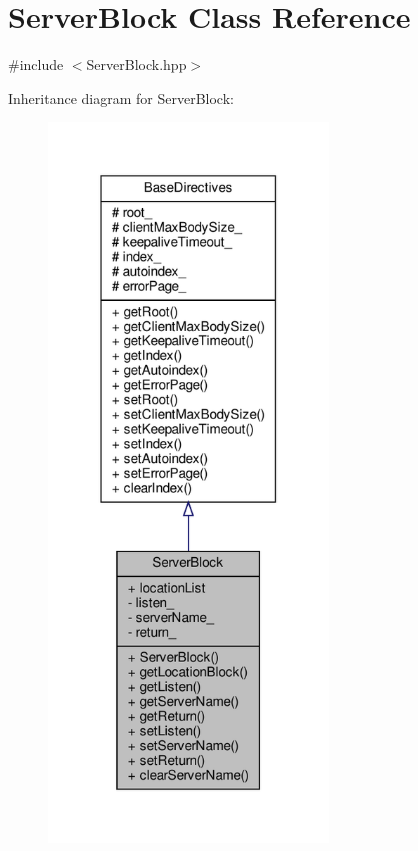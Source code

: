 \hypertarget{classft_1_1_server_block}{}\section{Server\+Block Class Reference}
\label{classft_1_1_server_block}


{\ttfamily \#include $<$Server\+Block.\+hpp$>$}



Inheritance diagram for Server\+Block\+:
\nopagebreak
\begin{figure}[H]
\begin{center}
\leavevmode
\includegraphics[width=211pt]{classft_1_1_server_block__inherit__graph}
\end{center}
\end{figure}


